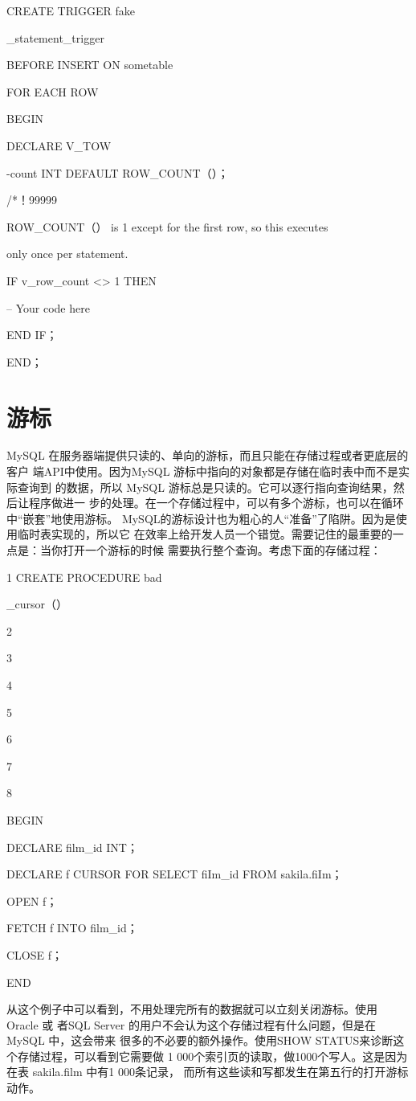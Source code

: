 CREATE TRIGGER fake

\_statement\_trigger

BEFORE INSERT ON sometable

FOR EACH ROW

BEGIN

DECLARE V\_TOW

-count INT DEFAULT ROW\_COUNT（）；

/*！99999

ROW\_COUNT（） is 1 except for the first row, so this executes

only once per statement.

IF v\_row\_count <> 1 THEN

-- Your code here

END IF；

END；

\section{游标}
MySQL 在服务器端提供只读的、单向的游标，而且只能在存储过程或者更底层的客户
端API中使用。因为MySQL 游标中指向的对象都是存储在临时表中而不是实际查询到
的数据，所以 MySQL 游标总是只读的。它可以逐行指向查询结果，然后让程序做进一
步的处理。在一个存储过程中，可以有多个游标，也可以在循环中“嵌套”地使用游标。
MySQL的游标设计也为粗心的人“准备”了陷阱。因为是使用临时表实现的，所以它
在效率上给开发人员一个错觉。需要记住的最重要的一点是：当你打开一个游标的时候
需要执行整个查询。考虑下面的存储过程：

1 CREATE PROCEDURE bad

\_cursor（）

2

3

4

5

6

7

8

BEGIN

DECLARE film\_id INT；

DECLARE f CURSOR FOR SELECT fiIm\_id FROM sakila.fiIm；

OPEN f；

FETCH f INTO film\_id；

CLOSE f；

END

从这个例子中可以看到，不用处理完所有的数据就可以立刻关闭游标。使用 Oracle 或
者SQL Server 的用户不会认为这个存储过程有什么问题，但是在MySQL 中，这会带来
很多的不必要的额外操作。使用SHOW STATUS来诊断这个存储过程，可以看到它需要做
1 000个索引页的读取，做1000个写人。这是因为在表 sakila.film 中有1 000条记录，
而所有这些读和写都发生在第五行的打开游标动作。

